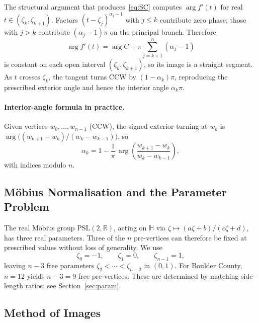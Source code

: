 \documentclass[11pt]{article}
\newcommand{\HH}{\mathbb{H}}
\newcommand{\RR}{\mathbb{R}}
\begin{document}
The structural argument that produces~\eqref{eq:SC} computes $\arg f'(t)$ for
real $t \in (\zeta_k, \zeta_{k+1})$. Factors $(t - \zeta_j)^{\alpha_j - 1}$
with $j \leq k$ contribute zero phase; those with $j > k$ contribute
$(\alpha_j - 1)\pi$ on the principal branch. Therefore
\begin{equation}
  \arg f'(t) = \arg C + \pi \sum_{j = k+1}^{n} (\alpha_j - 1)
  \label{eq:argfprime}
\end{equation}
is constant on each open interval $(\zeta_k, \zeta_{k+1})$, so its image is a
straight segment. As $t$ crosses $\zeta_k$, the tangent turns CCW by
$(1 - \alpha_k)\pi$, reproducing the prescribed exterior angle and hence the
interior angle $\alpha_k\pi$.

\paragraph{Interior-angle formula in practice.}
Given vertices $w_0, \dots, w_{n-1}$ (CCW), the signed exterior turning at
$w_k$ is $\arg\!\bigl((w_{k+1} - w_k) / (w_k - w_{k-1})\bigr)$, so
\begin{equation}
  \alpha_k = 1 - \frac{1}{\pi}\,
    \arg\!\left( \frac{w_{k+1} - w_k}{w_k - w_{k-1}} \right),
  \label{eq:alpha}
\end{equation}
with indices modulo $n$.

\subsection{M\"obius Normalisation and the Parameter Problem}

The real M\"obius group $\mathrm{PSL}(2, \RR)$, acting on $\HH$ via
$\zeta \mapsto (a\zeta + b)/(c\zeta + d)$, has three real parameters. Three of
the $n$ pre-vertices can therefore be fixed at prescribed values without loss
of generality. We use
\begin{equation}
  \zeta_0 = -1, \qquad \zeta_1 = 0, \qquad \zeta_{n-1} = 1,
  \label{eq:normalisation}
\end{equation}
leaving $n - 3$ free parameters $\zeta_2 < \cdots < \zeta_{n-2}$ in $(0, 1)$.
For Boulder County, $n = 12$ yields $n - 3 = 9$ free pre-vertices. These are
determined by matching side-length ratios; see Section~\ref{sec:param}.

\subsection{Method of Images}
\label{sec:images}
\end{document}
